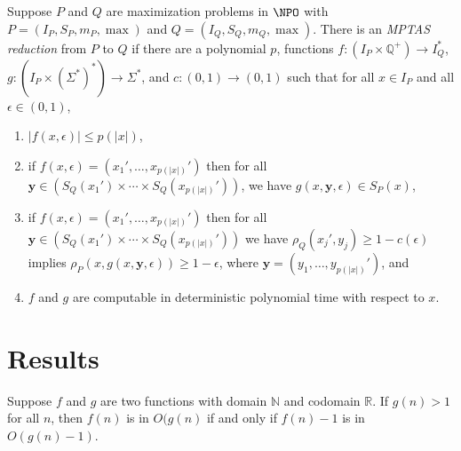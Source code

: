 \documentclass{article}
\begin{document}
\begin{definition}\label{def:mptasreduction}
  Suppose $P$ and $Q$ are maximization problems in $\NPO$ with $P = (I_P, S_P, m_P, \max)$ and $Q = (I_Q, S_Q, m_Q, \max)$.
  There is an \emph{MPTAS reduction} from $P$ to $Q$ if there are a polynomial $p$, functions $f \colon \left(I_P \times \mathbb{Q}^+\right) \to I_Q^*$, $g \colon \left(I_P \times {\left(\Sigma^*\right)}^* \right) \to \Sigma^*$, and $c \colon (0, 1) \to (0, 1)$ such that for all $x \in I_P$ and all $\epsilon \in (0, 1)$,
  \begin{enumerate}
  \item $|f(x, \epsilon)| \leq p(|x|)$,
  \item if $f(x, \epsilon) = (x_1', \dotsc, x_{p(|x|)}')$ then for all $\mathbf{y} \in (S_Q(x_1') \times \dotsb \times S_Q(x_{p(|x|)}'))$, we have $g(x, \mathbf{y}, \epsilon) \in S_P(x)$,
  \item if $f(x, \epsilon) = (x_1', \dotsc, x_{p(|x|)}')$ then for all $\mathbf{y} \in (S_Q(x_1') \times \dotsb \times S_Q(x_{p(|x|)}'))$ we have $\rho_Q(x_j', y_j) \geq 1 - c(\epsilon)$ implies $\rho_P(x, g(x, \mathbf{y}, \epsilon)) \geq 1 - \epsilon$, where $\mathbf{y} = (y_1, \dotsc, y_{p(|x|)}')$, and
  \item $f$ and $g$ are computable in deterministic polynomial time with respect to $x$.
  \end{enumerate}
\end{definition}

\section{Results}

\begin{lemma}\label{lem:bigo}
  Suppose $f$ and $g$ are two functions with domain $\mathbb{N}$ and codomain $\mathbb{R}$.
  If $g(n) > 1$ for all $n$, then $f(n)$ is in $O(g(n)$ if and only if $f(n) - 1$ is in $O(g(n) - 1)$.
\end{lemma}
\end{document}
